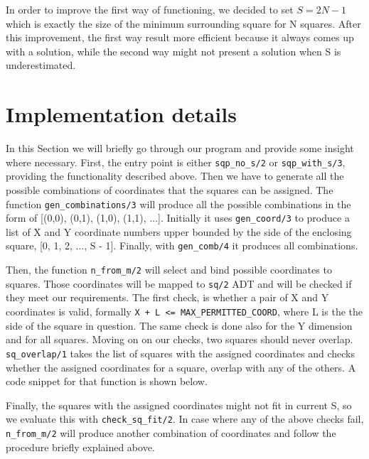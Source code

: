 \documentclass{article}
\begin{document}
In order to improve the first way of functioning, we decided to set $S=2N-1$ which is exactly the size of the minimum surrounding square for N squares. After this improvement, the first way result more efficient because it always comes up with a solution, while the second way might not present a solution when S is underestimated.

\section{Implementation details}

In this Section we will briefly go through our program and provide some insight where necessary. First, the entry point is either \texttt{sqp\_no\_s/2} or \texttt{sqp\_with\_s/3}, providing the functionality described above. Then we have to generate all the possible combinations of coordinates that the squares can be assigned. The function \texttt{gen\_combinations/3} will produce all the possible combinations in the form of [(0,0), (0,1), (1,0), (1,1), $\dots$]. Initially it uses \texttt{gen\_coord/3} to produce a list of  X and Y coordinate numbers upper bounded by the side of the enclosing square, [0, 1, 2, $\dots$, S - 1]. Finally, with \texttt{gen\_comb/4} it produces all combinations.

Then, the function \texttt{n\_from\_m/2} will select and bind possible coordinates to squares. Those coordinates will be mapped to \texttt{sq/2} ADT and will be checked if they meet our requirements. The first check, is whether a pair of X and Y coordinates is valid, formally \texttt{X + L <= MAX\_PERMITTED\_COORD}, where L is the the side of the square in question. The same check is done also for the Y dimension and for all squares. Moving on on our checks, two squares should never overlap. \texttt{sq\_overlap/1} takes the list of squares with the assigned coordinates and checks whether the assigned coordinates for a square, overlap with any of the others. A code snippet for that function is shown below.




Finally, the squares with the assigned coordinates might not fit in current S, so we evaluate this with \texttt{check\_sq\_fit/2}. In case where any of the above checks fail, \texttt{n\_from\_m/2} will produce another combination of coordinates and follow the procedure briefly explained above.
\end{document}
